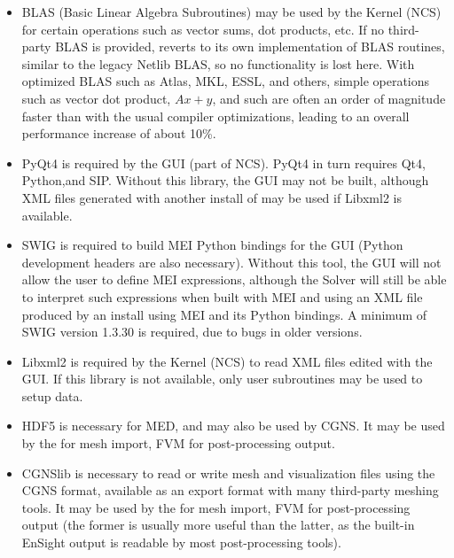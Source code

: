 \documentclass[a4paper,10pt,twoside]{article}
\begin{document}
\begin{itemize}

\item BLAS (Basic Linear Algebra Subroutines) may be used by the
      Kernel (NCS) for certain operations such as vector sums, dot
      products, etc. If no third-party BLAS is provided, \CS reverts to
      its own implementation of BLAS routines, similar to the legacy
      Netlib BLAS, so no functionality is lost here. With optimized BLAS
      such as Atlas, MKL, ESSL, and others, simple operations such as vector
      dot product, $Ax+y$, and such are often an order of magnitude
      faster than with the usual compiler optimizations, leading to an
      overall performance increase of about 10\%.

\item PyQt4 is required by the \CS GUI (part of NCS). PyQt4 in turn
      requires Qt4, Python,and SIP. Without this library, the GUI may not
      be built, although XML files generated with another install of \CS
      may be used if Libxml2 is available.

\item SWIG is required to build MEI Python bindings for the GUI
      (Python development headers are also necessary). Without this
      tool, the GUI will not allow the user to define MEI expressions,
      although the Solver will still be able to interpret such expressions
      when built with MEI and using an XML file produced by an install
      using MEI and its Python bindings. A minimum of SWIG version
      1.3.30 is required, due to bugs in older versions.

\item Libxml2 is required by the Kernel (NCS) to read XML files edited
      with the GUI. If this library is not available, only user subroutines
      may be used to setup data.

\item HDF5 is necessary for MED, and may also be used by CGNS. It may be
      used by the \pcs for mesh import, FVM for post-processing output.

\item CGNSlib is necessary to read or write mesh and visualization files
      using the CGNS format, available as an export format with many
      third-party meshing tools. It may be used by the \pcs for
      mesh import, FVM for post-processing output (the former is usually
      more useful than the latter, as the built-in EnSight output is
      readable by most post-processing tools).


\end{itemize}
\end{document}
